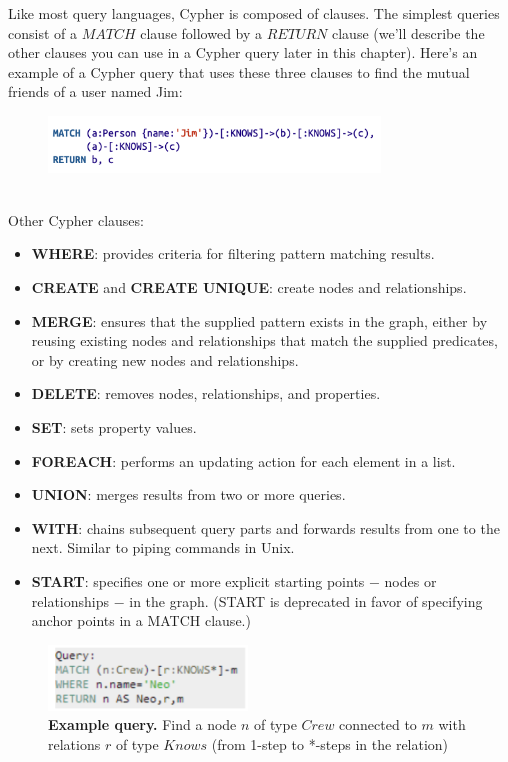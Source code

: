 \documentclass[10pt,a4paper]{article}
\begin{document}
Like most query languages, Cypher is composed of clauses. The simplest queries consist of a $MATCH$ clause followed by a $RETURN$ clause (we’ll describe the other clauses you can use in a Cypher query later in this chapter). Here’s an example of a Cypher query that uses these three clauses to find the mutual friends of a user named Jim:
\begin{figure}[h!]
 \hfill \includegraphics[width=250pt]{images/cypher-pattern3.png}\hspace*{\fill}
\end{figure}  \\
Other Cypher clauses:
\begin{itemize}
	\item \textbf{WHERE}: provides criteria for filtering pattern matching results.
	\item \textbf{CREATE} and \textbf{CREATE UNIQUE}: create nodes and relationships.
	\item \textbf{MERGE}: ensures that the supplied pattern exists in the graph, either by reusing existing nodes and relationships that match the supplied predicates, or by creating new nodes and relationships.
	\item \textbf{DELETE}: removes nodes, relationships, and properties.
	\item \textbf{SET}: sets property values.
	\item \textbf{FOREACH}: performs an updating action for each element in a list.
	\item \textbf{UNION}: merges results from two or more queries.
	\item \textbf{WITH}: chains subsequent query parts and forwards results from one to the next. Similar to piping commands in Unix.
	\item \textbf{START}: specifies one or more explicit starting points $-$ nodes or relationships $-$ in the graph. (START is deprecated in favor of specifying anchor points in a MATCH clause.)
\end{itemize}
\begin{figure}[h!]
 \hfill \includegraphics[width=150pt]{images/cypher-ex-query2.png}\hspace*{\fill}
 \caption{\textbf{Example query.} Find a node $n$ of type $Crew$ connected to $m$ with relations $r$ of type $Knows$ (from 1-step to *-steps in the relation) }
\end{figure}
\end{document}
